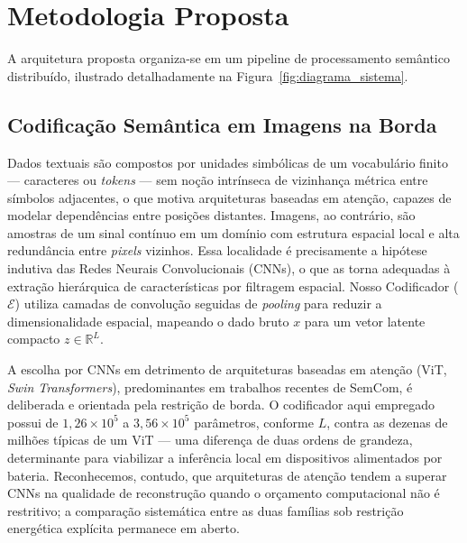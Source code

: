 \documentclass[conference,twocolumn]{IEEEtran}
\begin{document}
\section{Metodologia Proposta}

A arquitetura proposta organiza-se em um pipeline de processamento semântico distribuído, ilustrado detalhadamente na Figura~\ref{fig:diagrama_sistema}.

\subsection{Codificação Semântica em Imagens na Borda}
Dados textuais são compostos por unidades simbólicas de um vocabulário finito --- caracteres ou \textit{tokens} --- sem noção intrínseca de vizinhança métrica entre símbolos adjacentes, o que motiva arquiteturas baseadas em atenção, capazes de modelar dependências entre posições distantes. Imagens, ao contrário, são amostras de um sinal contínuo em um domínio com estrutura espacial local e alta redundância entre \textit{pixels} vizinhos. Essa localidade é precisamente a hipótese indutiva das Redes Neurais Convolucionais (CNNs), o que as torna adequadas à extração hierárquica de características por filtragem espacial. Nosso Codificador ($\mathcal{E}$) utiliza camadas de convolução seguidas de \textit{pooling} para reduzir a dimensionalidade espacial, mapeando o dado bruto $x$ para um vetor latente compacto $z \in \mathbb{R}^L$.

A escolha por CNNs em detrimento de arquiteturas baseadas em atenção (ViT, \textit{Swin Transformers}), predominantes em trabalhos recentes de SemCom, é deliberada e orientada pela restrição de borda. O codificador aqui empregado possui de $1{,}26 \times 10^5$ a $3{,}56 \times 10^5$ parâmetros, conforme $L$, contra as dezenas de milhões típicas de um ViT --- uma diferença de duas ordens de grandeza, determinante para viabilizar a inferência local em dispositivos alimentados por bateria. Reconhecemos, contudo, que arquiteturas de atenção tendem a superar CNNs na qualidade de reconstrução quando o orçamento computacional não é restritivo; a comparação sistemática entre as duas famílias sob restrição energética explícita permanece em aberto.
\end{document}
